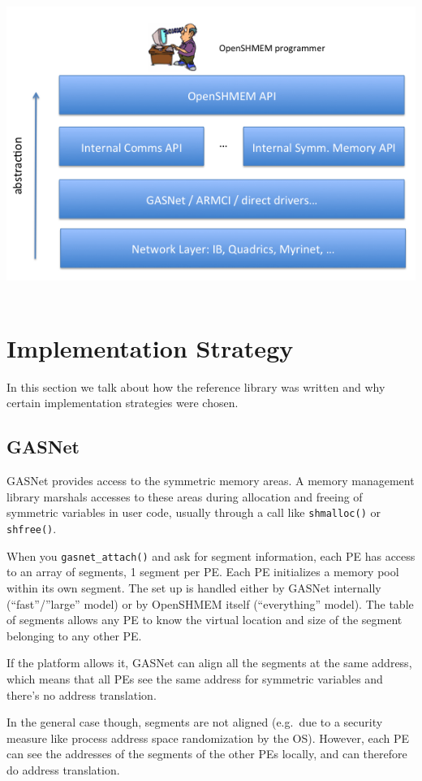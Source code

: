 \documentclass[english]{article}
\newcommand{\openshmem} {\mbox{OpenSHMEM}\xspace}
\begin{document}
\medskip{}

\title{\includegraphics[scale=0.5]{implementation}}

\section{Implementation Strategy}

In this section we talk about how the reference library was written
and why certain implementation strategies were chosen.

\subsection{GASNet}

GASNet provides access to the symmetric memory areas. A memory
management library marshals accesses to these areas during allocation
and freeing of symmetric variables in user code, usually through a
call like \texttt{shmalloc()} or \texttt{shfree()}.

When you \texttt{gasnet\_attach()} and ask for segment information,
each PE has access to an array of segments, 1 segment per PE. Each PE
initializes a memory pool within its own segment. The set up is
handled either by GASNet internally (``fast''/''large'' model) or by
\openshmem itself (``everything'' model). The table of segments
allows any PE to know the virtual location and size of the segment
belonging to any other PE.

If the platform allows it, GASNet can align all the segments at the
same address, which means that all PEs see the same address for
symmetric variables and there's no address translation.

In the general case though, segments are not aligned (e.g.\ due to a
security measure like process address space randomization by the
OS). However, each PE can see the addresses of the segments of the
other PEs locally, and can therefore do address translation.
\end{document}
